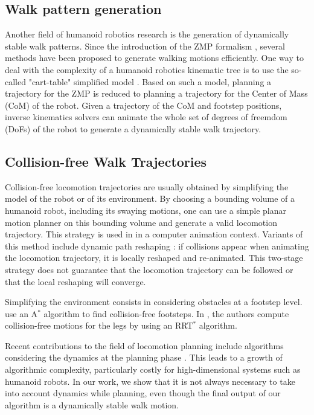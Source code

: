 \documentclass{article}
\begin{document}
\subsection{Walk pattern generation}

Another  field of  humanoid  robotics research  is  the generation  of
dynamically stable  walk patterns. Since  the introduction of  the ZMP
formalism  \cite{vukobratovic1969contribution},  several  methods  have  been  proposed  to
generate  walking  motions efficiently.   One  way  to  deal with  the
complexity  of a  humanoid  robotics  kinematic tree  is  to use  the
so-called "cart-table" simplified model \cite{kajita2003biped}. Based on such a
model,  planning a trajectory  for the  ZMP is  reduced to  planning a
trajectory  for  the Center  of  Mass (CoM)  of  the  robot.  Given  a
trajectory  of  the CoM  and  footstep  positions, inverse  kinematics
solvers can animate  the whole set of degrees of freemdom (DoFs) of the  
robot to generate a dynamically stable walk trajectory.

\subsection{Collision-free Walk Trajectories}

Collision-free  locomotion   trajectories  are  usually   obtained  by
simplifying the model of the  robot or of its environment. By choosing
a bounding volume of a  humanoid robot, including its swaying motions,
one can  use a simple  planar motion planner  on this bounding  volume and
generate  a valid  locomotion  trajectory. This  strategy  is used  in
\cite{pettre20032} in a computer animation context. Variants of this method
include  dynamic path reshaping  \cite{yoshida-humanoids05}: if  collisions appear
when animating  the locomotion  trajectory, it is  locally reshaped
and re-animated.  This two-stage  strategy does not guarantee that the
locomotion trajectory can be followed or that the local reshaping will
converge.

Simplifying  the environment  consists in  considering obstacles  at a
footstep   level.   \cite{chestnutt2005footstep,kuffner2005motion}
use   an  
A$^{*}$   algorithm  to   find
collision-free   footsteps.    In   \cite{perrinbiped},   the   authors   compute
collision-free motions  for the legs by using  an RRT$^{*}$ algorithm.


Recent contributions to the field of locomotion planning  include algorithms 
considering the dynamics at the planning phase \cite{shkolnik2011bounding}. This leads to 
a growth of algorithmic complexity, particularly costly for high-dimensional
systems such as humanoid robots. In our work, we show that it is not always
necessary to take into account dynamics while planning, even though the final
output of our algorithm is a dynamically stable walk motion.
\end{document}
